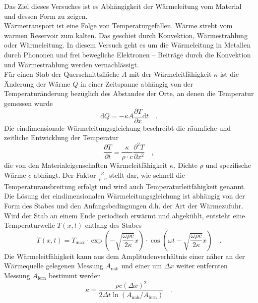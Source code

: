 Das Ziel dieses Versuches ist es Abhängigkeit der Wärmeleitung vom Material und dessen Form zu zeigen. \\
Wärmetransport ist eine Folge von Temperaturgefällen. Wärme strebt vom warmen Reservoir zum kalten. Das geschiet durch Konvektion, Wärmestrahlung oder Wärmeleitung. In diesem Versuch geht es um die Wärmeleitung in Metallen durch Phononen und frei bewegliche Elektronen -- Beiträge durch die Konvektion und Wärmestrahlung werden vernachlässigt. \\
Für einen Stab der Querschnittsfläche $A$ mit der Wärmeleitfähigkeit $\kappa$ ist die Änderung der Wärme $Q$ in einer Zeitspanne abhängig von der Temperaturänderung bezüglich des Abstandes der Orte, an denen die Temperatur gemessen wurde
\begin{equation}\label{Warmestrom}
\text{d}Q = - \kappa A \frac{\partial T}{\partial x} \text{d}t \quad .
\end{equation}
Die eindimensionale Wärmeleitungsgleichung beschreibt die räumliche und zeitliche Entwicklung der Temperatur
\begin{equation}
\frac{\partial T}{\partial t} = \frac{\kappa}{\rho \cdot c} \frac{\partial ^2 T}{\partial x^2} \quad,
\end{equation}
die von den Materialeigenschaften Wärmeleitfähigkeit $\kappa$, Dichte $\rho$ und spezifische Wärme $c$ abhängt.  Der Faktor $\frac{\kappa}{\rho \cdot c}$ stellt dar, wie schnell die Temperaturausbreitung erfolgt und wird auch Temperaturleitfähigkeit genannt. \\
Die Lösung der eindimensionalen Wärmeleitungsgleichung ist abhängig von der Form des Stabes und den Anfangsbedingungen d.h. der Art der Wärmezufuhr. Wird der Stab an einem Ende periodisch erwärmt und abgekühlt, entsteht eine Temperaturwelle $T(x,t)$ entlang des Stabes 
\begin{equation}\label{Welle}
T(x,t) = T_\text{max} \cdot \exp\left( - \sqrt{\frac{\omega \rho c}{2 \kappa}}x\right) \cdot \cos \left(\omega t - \sqrt{\frac{\omega \rho c}{2 \kappa}}x\right) \quad.
\end{equation}
Die Wärmeleitfähigkeit kann aus dem Amplitudenverhältnis einer näher an der Wärmequelle gelegenen Messung $A_\text{nah}$ und einer um $\Delta x$ weiter entfernten Messung $A_\text{fern}$ bestimmt werden
\begin{equation}\label{Warmekappazitat}
\kappa = \frac{\rho  c (\Delta x )^2}{2  \Delta t \ln \left(A_\text{nah} / A_\text{fern}\right)} \quad.
\end{equation}
